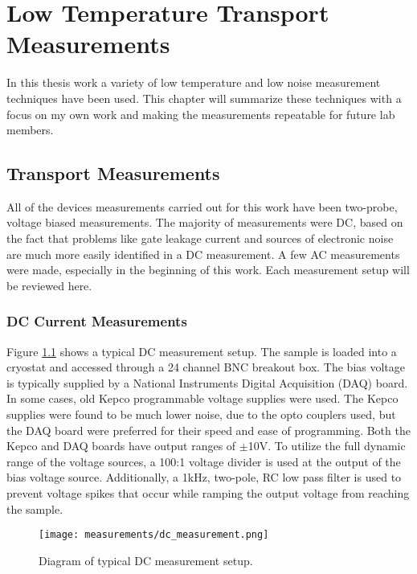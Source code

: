 \chapter{Low Temperature Transport Measurements}
\label{sec:measurement}

In this thesis work a variety of low temperature and low noise measurement techniques have been used. This chapter will summarize these techniques with a focus on my own work and making the measurements repeatable for future lab members. 

\section{Transport Measurements}

All of the devices measurements carried out for this work have been two-probe, voltage biased measurements. The majority of measurements were DC, based on the fact that problems like gate leakage current and sources of electronic noise are much more easily identified in a DC measurement. A few AC measurements were made, especially in the beginning of this work. Each measurement setup will be reviewed here.

\subsection{DC Current Measurements}
\label{sec:DC}

Figure \ref{fig:dc_measurement} shows a typical DC measurement setup. The sample is loaded into a cryostat and accessed through a 24 channel BNC breakout box. The bias voltage is typically supplied by a National Instruments Digital Acquisition (DAQ) board. In some cases, old Kepco programmable voltage supplies were used. The Kepco supplies were found to be much lower noise, due to the opto couplers used, but the DAQ board were preferred for their speed and ease of programming. Both the Kepco and DAQ boards have output ranges of $\pm$10V. To utilize the full dynamic range of the voltage sources, a 100:1 voltage divider is used at the output of the bias voltage source. Additionally, a 1kHz, two-pole, RC low pass filter is used to prevent voltage spikes that occur while ramping the output voltage from reaching the sample.

\begin{figure}
    \centering
    \texttt{[image: measurements/dc\_measurement.png]}
    \caption{Diagram of typical DC measurement setup.}
    \label{fig:dc_measurement}
\end{figure}

